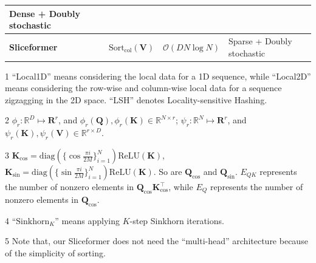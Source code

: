 \begin{table}[t]
{\begin{threeparttable}
{\begin{tabular}{l|lll}
    Dense + Doubly stochastic\\
    \hline
    \textbf{Sliceformer}  & 
    $\text{Sort}_{\text{col}}(\bm{V})$ & 
    $\mathcal{O}(DN\log N)$ &
    Sparse + Doubly stochastic\\
    \hline\hline
    \end{tabular}
    }
    \begin{tablenotes}
    \item[1] \footnotesize{``Local1D'' means considering the local data for a 1D sequence, while ``Local2D'' means considering the row-wise and column-wise local data for a sequence zigzagging in the 2D space. ``LSH'' denotes Locality-sensitive Hashing.}
    \item[2] \footnotesize{$\phi_r: \mathbb{R}^{D}\mapsto\mathbf{R}^r$, and $\phi_r(\bm{Q}),\phi_r(\bm{K})\in\mathbb{R}^{N\times r}$; $\psi_r: \mathbb{R}^{N}\mapsto\mathbf{R}^r$, and $\psi_r(\bm{K}),\psi_r(\bm{V})\in\mathbb{R}^{r\times D}$.}
    \item[3] $\bm{K}_{\cos}=\text{diag}(\{\cos\frac{\pi i}{2M}\}_{i=1}^{N})\text{ReLU}(\bm{K})$, $\bm{K}_{\sin}=\text{diag}(\{\sin\frac{\pi i}{2M}\}_{i=1}^{N})\text{ReLU}(\bm{K})$. So are $\bm{Q}_{\cos}$ and $\bm{Q}_{\sin}$. 
    $E_{QK}$ represents the number of nonzero elements in $\bm{Q}_{\cos}\bm{K}_{\cos}^{\top}$, while $E_Q$ represents the number of nonzero elements in $\bm{Q}_{\cos}$.
    \item[4] ``$\text{Sinkhorn}_{K}$'' means applying $K$-step Sinkhorn iterations.
    \item[5] Note that, our Sliceformer does not need the ``multi-head'' architecture because of the simplicity of sorting.
    \end{tablenotes}
    \end{threeparttable}
}
\end{table}

